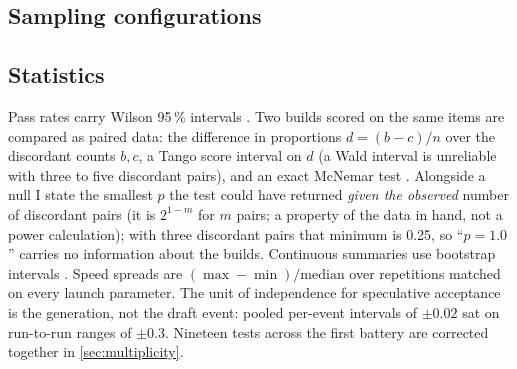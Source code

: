 \subsection{Sampling configurations}
\begin{table}[h]
\centering\small
\caption{Sampling configurations. Absolute scores are not comparable across rows, and rows are never
mixed in a table.}\label{tab:sampling}
\end{table}

\subsection{Statistics}
Pass rates carry Wilson 95\,\% intervals \citep{wilson1927interval}. Two builds scored on the same
items are compared as paired data: the difference in proportions $d=(b-c)/n$ over the discordant
counts $b,c$, a Tango score interval on $d$ (a Wald interval is unreliable with three to five discordant pairs), and an exact McNemar test \citep{mcnemar1947test}. Alongside a null I state the smallest $p$ the test could have returned \emph{given the observed} number of
discordant pairs (it is $2^{1-m}$ for $m$ pairs; a property of the data in hand, not a power calculation); with three discordant pairs that minimum is 0.25, so ``$p=1.0$'' carries no
information about the builds. Continuous summaries use bootstrap intervals \citep{efron1979bootstrap}.
Speed spreads are $(\max-\min)/\text{median}$ over repetitions matched on every launch parameter. The
unit of independence for speculative acceptance is the generation, not the draft event: pooled
per-event intervals of $\pm0.02$ sat on run-to-run ranges of $\pm0.3$. Nineteen tests across the first
battery are corrected together in \cref{sec:multiplicity}.

